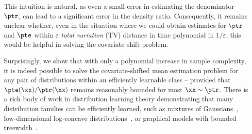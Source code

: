 This intuition is natural, as even a small error in estimating the denominator $\ptr$, can lead to a significant error in the density ratio. Consequently, it remains unclear whether, even in the situation where we could obtain estimates for $\ptr$ and $\pte$ within $\varepsilon$ \emph{total variation} (TV) distance in time polynomial in $1/\varepsilon$, this would be helpful in solving the covariate shift problem.


Surprisingly, we show that with only a polynomial increase in sample complexity, it is indeed possible to solve the covariate-shifted mean estimation problem for any pair of distributions within an efficiently learnable class -- provided that $\pte(\xx)/\ptr(\xx)$ remains reasonably bounded for most $\xx \sim \ptr$. There is a rich body of work in distribution learning theory demonstrating that many distribution families can be efficiently learned, such as mixtures of Gaussians~\cite{moitra2010settling,liu2022clustering}, low-dimensional log-concave distributions~\cite{diakonikolas2017learning}, or graphical models with bounded treewidth~\cite{narasimhan2004paclearning}.